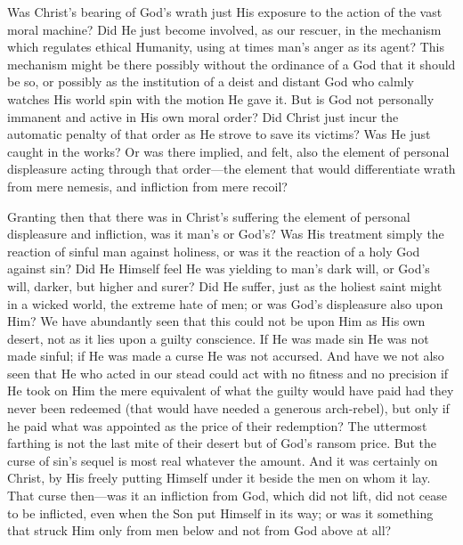 \documentclass[12pt,letterpaper,oneside]{book}
\begin{document}
Was Christ's bearing of God's wrath just His exposure 
to the action of the vast moral machine? Did He just 
become involved, as our rescuer, in the mechanism which 
regulates ethical Humanity, using at times man's anger as 
its agent? This mechanism might be there possibly without 
the ordinance of a God that it should be so, or possibly 
as the institution of a deist and distant God who calmly 
watches His world spin with the motion He gave it. But 
is God not personally immanent and active in His own 
moral order? Did Christ just incur the automatic penalty 
of that order as He strove to save its victims? Was He 
just caught in the works? Or was there implied, and 
felt, also the element of personal displeasure acting 
through that order---the element that would differentiate 
wrath from mere nemesis, and infliction from mere recoil? 

Granting then that there was in Christ's suffering the 
element of personal displeasure and infliction, was it man's 
or God's? Was His treatment simply the reaction of 
sinful man against holiness, or was it the reaction of a 
holy God against sin? Did He Himself feel He was 
yielding to man's dark will, or God's will, darker, but 
higher and surer? Did He suffer, just as the holiest 
saint might in a wicked world, the extreme hate of 
men; or was God's displeasure also upon Him? We 
have abundantly seen that this could not be upon Him as 
His own desert, not as it lies upon a guilty conscience. 
If He was made sin He was not made sinful; if He was 
made a curse He was not accursed. And have we not 
also seen that He who acted in our stead could act with 
no fitness and no precision if He took on Him the mere 
equivalent of what the guilty would have paid had they 
never been redeemed (that would have needed a generous 
arch-rebel), but only if he paid what was appointed as the 
price of their redemption? The uttermost farthing is not 
the last mite of their desert but of God's ransom price. 
But the curse of sin's sequel is most real whatever the 
amount. And it was certainly on Christ, by His freely 
putting Himself under it beside the men on whom it lay. 
That curse then---was it an infliction from God, which did 
not lift, did not cease to be inflicted, even when the Son 
put Himself in its way; or was it something that struck 
Him only from men below and not from God above 
at all? 
\end{document}
